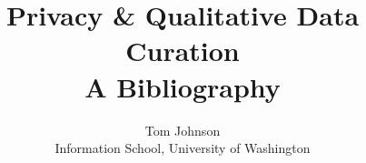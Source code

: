\documentclass [11pt]{article}
\title{Privacy \& Qualitative Data Curation \\ A Bibliography}
\author{Tom Johnson\\Information School, University of Washington}
\begin{document}
\maketitle

\nocite{*}


\end{document}

